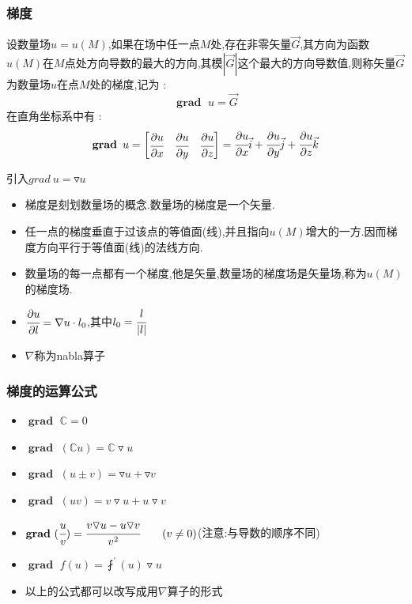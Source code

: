 \documentclass[UTF8,12pt]{ctexbook}
\newcommand{\derivative}{^\prime}
\newcommand{\fDerivative}[1]{\fint\derivative(#1)}
\newcommand{\defFunction}[1]{f(#1)}
\newcommand{\mathConstant}{\mathbb{C}}
\newcommand{\partialDerivativeFrac}[2]{\cfrac{\partial #1}{\partial #2}}
\DeclareMathOperator{\gradText}{\mathbf{grad}\ }
\begin{document}
{{{{    \subsubsection{梯度}{
      设数量场$u = u(M)$,如果在场中任一点$M$处,存在非零矢量$\vec{G}$,其方向为函数$u(M)$在$M$点处方向导数的最大的方向,其模$|\vec{G}|$这个最大的方向导数值,则称矢量$\vec{G}$为数量场$u$在点$M$处的梯度,记为 :
      $$
        \gradText u = \vec{G}
      $$
      在直角坐标系中有 :
      $$
        \gradText u = \begin{bmatrix}
          \partialDerivativeFrac{u}{x} & \partialDerivativeFrac{u}{y} & \partialDerivativeFrac{u}{z}
        \end{bmatrix} = \partialDerivativeFrac{u}{x}\vec{i} + \partialDerivativeFrac{u}{y}\vec{j} + \partialDerivativeFrac{u}{z}\vec{k}
      $$

      引入$grad\ u = \triangledown u$

      \begin{itemize}
        \item 梯度是刻划数量场的概念.数量场的梯度是一个矢量.
        \item 任一点的梯度垂直于过该点的等值面(线),并且指向$u(M)$增大的一方.因而梯度方向平行于等值面(线)的法线方向.
        \item 数量场的每一点都有一个梯度,他是矢量,数量场的梯度场是矢量场,称为$u(M)$的梯度场.
        \item $\partialDerivativeFrac{u}{l} = \nabla u \cdot l_0$,其中$l_0= \cfrac{l}{|l|}$
        \item $\nabla$称为nabla算子
      \end{itemize}
    }%

    \subsubsection{梯度的运算公式}{
      \begin{itemize}
        \item $\gradText \mathConstant = 0$
        \item $\gradText (\mathConstant u) = \mathConstant \triangledown u$
        \item $\gradText (u \pm v) = \triangledown u + \triangledown v$
        \item $\gradText (uv) = v\triangledown u + u\triangledown v$
        \item $\gradText (\cfrac{u}{v}) = \cfrac{v\triangledown u - u\triangledown v}{v^2}\qquad (v \neq 0)$(注意:与导数的顺序不同)
        \item $\gradText \defFunction{u} = \fDerivative{u}\triangledown u$
        \item 以上的公式都可以改写成用$\nabla$算子的形式
      \end{itemize}
    }%

}}}}
\end{document}
